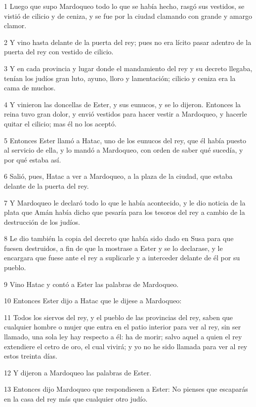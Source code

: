 \par 1 Luego que supo Mardoqueo todo lo que se había hecho, rasgó sus vestidos, se vistió de cilicio y de ceniza, y se fue por la ciudad clamando con grande y amargo clamor.
\par 2 Y vino hasta delante de la puerta del rey; pues no era lícito pasar adentro de la puerta del rey con vestido de cilicio.
\par 3 Y en cada provincia y lugar donde el mandamiento del rey y su decreto llegaba, tenían los judíos gran luto, ayuno, lloro y lamentación; cilicio y ceniza era la cama de muchos.
\par 4 Y vinieron las doncellas de Ester, y sus eunucos, y se lo dijeron. Entonces la reina tuvo gran dolor, y envió vestidos para hacer vestir a Mardoqueo, y hacerle quitar el cilicio; mas él no los aceptó.
\par 5 Entonces Ester llamó a Hatac, uno de los eunucos del rey, que él había puesto al servicio de ella, y lo mandó a Mardoqueo, con orden de saber qué sucedía, y por qué estaba así.
\par 6 Salió, pues, Hatac a ver a Mardoqueo, a la plaza de la ciudad, que estaba delante de la puerta del rey.
\par 7 Y Mardoqueo le declaró todo lo que le había acontecido, y le dio noticia de la plata que Amán había dicho que pesaría para los tesoros del rey a cambio de la destrucción de los judíos.
\par 8 Le dio también la copia del decreto que había sido dado en Susa para que fuesen destruidos, a fin de que la mostrase a Ester y se lo declarase, y le encargara que fuese ante el rey a suplicarle y a interceder delante de él por su pueblo.
\par 9 Vino Hatac y contó a Ester las palabras de Mardoqueo.
\par 10 Entonces Ester dijo a Hatac que le dijese a Mardoqueo:
\par 11 Todos los siervos del rey, y el pueblo de las provincias del rey, saben que cualquier hombre o mujer que entra en el patio interior para ver al rey, sin ser llamado, una sola ley hay respecto a él: ha de morir; salvo aquel a quien el rey extendiere el cetro de oro, el cual vivirá; y yo no he sido llamada para ver al rey estos treinta días.
\par 12 Y dijeron a Mardoqueo las palabras de Ester.
\par 13 Entonces dijo Mardoqueo que respondiesen a Ester: No pienses que escaparás en la casa del rey más que cualquier otro judío.
